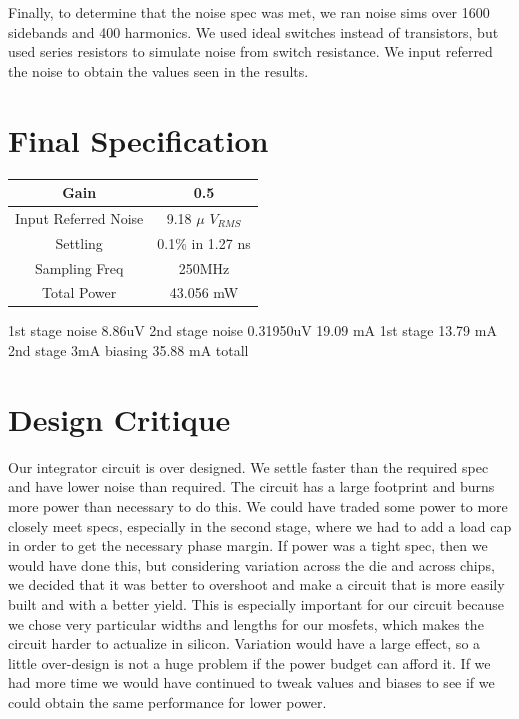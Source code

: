 \documentclass[conference]{IEEEtran}
\begin{document}
Finally, to determine that the noise spec was met, we ran noise sims over 1600 sidebands and 400 harmonics. We used ideal switches instead of transistors, but used series resistors to simulate noise from switch resistance. We input referred the noise to obtain the values seen in the results.\\

\section{Final Specification}

\begin{center}
\begin{tabular}{|c|c|} 
\hline
Gain & 0.5 \\
\hline
Input Referred Noise & 9.18 $\mu$ $V_{RMS}$ \\
\hline
Settling & 0.1\% in 1.27 ns \\
\hline
Sampling Freq & 250MHz \\
\hline
Total Power & 43.056 mW \\
\hline
\end{tabular}
\end{center}

1st stage noise 8.86uV
2nd stage noise 0.31950uV
19.09 mA 1st stage
13.79 mA 2nd stage
3mA biasing
35.88 mA totall

\section{Design Critique}

Our integrator circuit is over designed. We settle faster than the required spec and have lower noise than required. The circuit has a large footprint and burns more power than necessary to do this. We could have traded some power to more closely meet specs, especially in the second stage, where we had to add a load cap in order to get the necessary phase margin. If power was a tight spec, then we would have done this, but considering variation across the die and across chips, we decided that it was better to overshoot and make a circuit that is more easily built and with a better yield. This is especially important for our circuit because we chose very particular widths and lengths for our mosfets, which makes the circuit harder to actualize in silicon. Variation would have a large effect, so a little over-design is not a huge problem if the power budget can afford it. If we had more time we would have continued to tweak values and biases to see if we could obtain the same performance for lower power.
\end{document}
